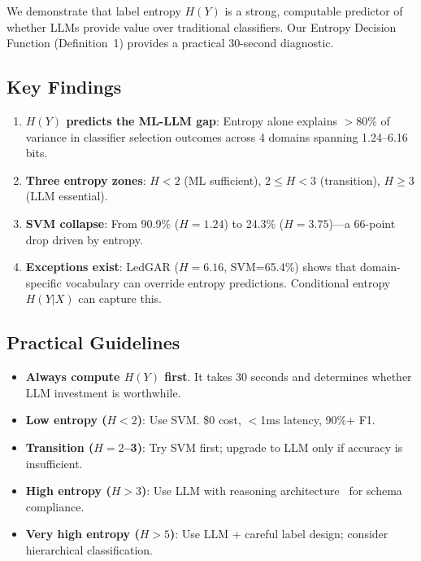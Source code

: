 \documentclass[review,3p]{elsarticle}
\begin{document}
We demonstrate that label entropy $H(Y)$ is a strong, computable predictor of whether LLMs provide value over traditional classifiers. Our Entropy Decision Function (Definition~1) provides a practical 30-second diagnostic.

\subsection{Key Findings}
\begin{enumerate}
\item \textbf{$H(Y)$ predicts the ML-LLM gap}: Entropy alone explains $>$80\% of variance in classifier selection outcomes across 4 domains spanning 1.24--6.16 bits.
\item \textbf{Three entropy zones}: $H < 2$ (ML sufficient), $2 \leq H < 3$ (transition), $H \geq 3$ (LLM essential).
\item \textbf{SVM collapse}: From 90.9\% ($H=1.24$) to 24.3\% ($H=3.75$)---a 66-point drop driven by entropy.
\item \textbf{Exceptions exist}: LedGAR ($H=6.16$, SVM=65.4\%) shows that domain-specific vocabulary can override entropy predictions. Conditional entropy $H(Y|X)$ can capture this.
\end{enumerate}

\subsection{Practical Guidelines}
\begin{itemize}
\item \textbf{Always compute $H(Y)$ first}. It takes 30 seconds and determines whether LLM investment is worthwhile.
\item \textbf{Low entropy ($H < 2$)}: Use SVM. \$0 cost, $<$1ms latency, 90\%+ F1.
\item \textbf{Transition ($H = 2$--3)}: Try SVM first; upgrade to LLM only if accuracy is insufficient.
\item \textbf{High entropy ($H > 3$)}: Use LLM with reasoning architecture~\cite{p21} for schema compliance.
\item \textbf{Very high entropy ($H > 5$)}: Use LLM + careful label design; consider hierarchical classification.
\end{itemize}
\end{document}
